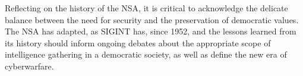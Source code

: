 \documentclass[12pt]{article}
\begin{document}
Reflecting on the history of the NSA, it is critical to acknowledge the delicate balance between the need for security and the preservation of democratic values. The NSA has adapted, as SIGINT has, since 1952, and the lessons learned from its history should inform ongoing debates about the appropriate scope of intelligence gathering in a democratic society, as well as define the new era of cyberwarfare. 

\clearpage

\begin{singlespace}


\end{singlespace}
\end{document}
